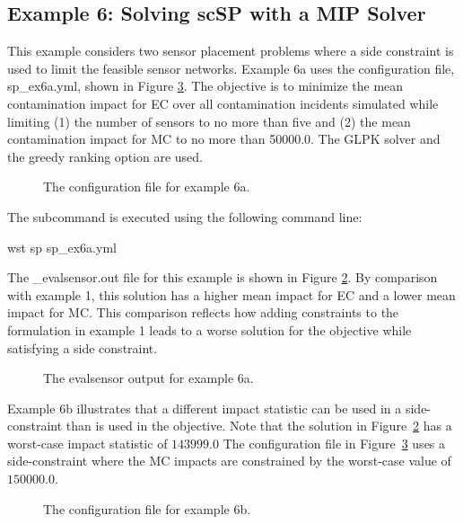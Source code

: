 \FloatBarrier 
\subsection{Example 6: Solving scSP with a MIP Solver}
\label{sp_example6}

This example considers two sensor placement problems where a side constraint
is used to limit the feasible sensor networks.
Example 6a uses the configuration file, sp\_ex6a.yml, shown in Figure
\ref{fig:sp_ex6a}. The objective is to minimize the mean contamination 
impact for EC over all contamination incidents simulated
while limiting (1) the number of sensors to no more than five and (2) the
mean contamination impact for MC to no more than 50000.0.
The GLPK solver and the greedy ranking option are used.

\begin{figure}[h]
  \caption{The  configuration file for example 6a.}
  \label{fig:sp_ex6a}
\end{figure}

The  subcommand is executed using the following command line:

\begin{unknownListing}
wst sp sp_ex6a.yml
\end{unknownListing}

The {\outputprefix}\_evalsensor.out file for this example is shown in Figure
\ref{fig:sp_ex6a_evalsensor}. By comparison with example 1, this
solution has a higher mean impact for EC and a lower mean impact for MC.
This comparison reflects how adding constraints to the formulation in
example 1 leads to a worse solution for the objective while satisfying a
side constraint.

\begin{figure}[h]
  \caption{The evalsensor output for  example 6a.}
  \label{fig:sp_ex6a_evalsensor}
\end{figure}

Example 6b illustrates that a different impact statistic can be
used in a side-constraint than is used in the objective.  Note that
the solution in Figure~\ref{fig:sp_ex6a_evalsensor} has a worst-case
impact statistic of $143999.0$ The configuration file in
Figure~\ref{fig:sp_ex6a} uses a side-constraint where the MC impacts
are constrained by the worst-case value of $150000.0$.

\begin{figure}[h]
  \caption{The  configuration file for example 6b.}
  \label{fig:sp_ex6a}
\end{figure}


